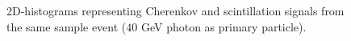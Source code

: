 \begin{figure}
	\centering
	 \quad
	\caption{2D-histograms representing Cherenkov and scintillation signals from the same sample event ($40$ GeV photon as primary particle).}
	\label{fig:2Dhist}
\end{figure}

